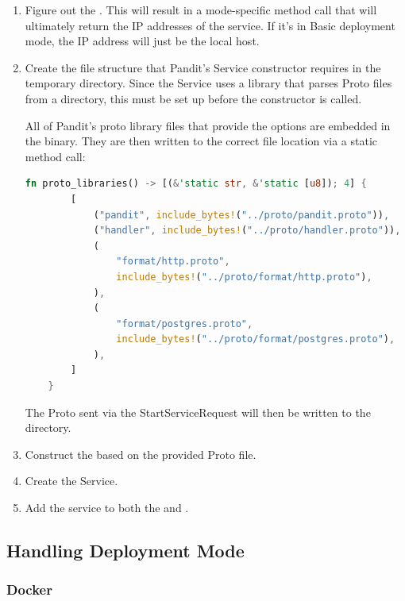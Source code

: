 \documentclass[a4paper,12pt]{report}
\begin{document}
\begin{enumerate}
    \item Figure out the . This will result in a mode-specific method call that will ultimately return the IP addresses of the service. If it's in Basic deployment mode, the IP address will just be the local host.
    
    \item Create the file structure that Pandit's Service constructor requires in the temporary directory. Since the Service uses a library that parses Proto files from a directory, this must be set up before the constructor is called.
    
    All of Pandit's proto library files that provide the options are embedded in the binary. They are then written to the correct file location via a static method call:
    
    \begin{lstlisting}[language=Rust]
    fn proto_libraries() -> [(&'static str, &'static [u8]); 4] {
        [
            ("pandit", include_bytes!("../proto/pandit.proto")),
            ("handler", include_bytes!("../proto/handler.proto")),
            (
                "format/http.proto",
                include_bytes!("../proto/format/http.proto"),
            ),
            (
                "format/postgres.proto",
                include_bytes!("../proto/format/postgres.proto"),
            ),
        ]
    }
    \end{lstlisting}
    
    The Proto sent via the StartServiceRequest will then be written to the directory.
    
    \item Construct the  based on the provided Proto file.
    
    \item Create the Service.
    
    \item Add the service to both the  and .
\end{enumerate}

\subsection{Handling Deployment Mode}
\subsubsection{Docker}
\end{document}
